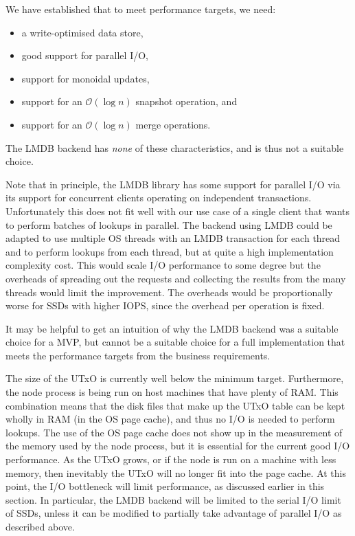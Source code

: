 \documentclass[11pt,a4paper]{article}
\begin{document}
We have established that to meet performance targets, we need:
\begin{itemize}
\item a write-optimised data store,
\item good support for parallel I/O,
\item support for monoidal updates,
\item support for an $\mathcal{O}(\log n)$ {\sc snapshot} operation, and
\item support for an $\mathcal{O}(\log n)$ {\sc merge} operations.
\end{itemize}
The LMDB backend has \emph{none} of these characteristics, and is thus not a
suitable choice.

Note that in principle, the LMDB library has some support for parallel I/O via
its support for concurrent clients operating on independent transactions.
Unfortunately this does not fit well with our use case of a single client that
wants to perform batches of lookups in parallel. The backend using LMDB could
be adapted to use multiple OS threads with an LMDB transaction for each thread
and to perform lookups from each thread, but at quite a high implementation
complexity cost. This would scale I/O performance to some degree but the
overheads of spreading out the requests and collecting the results from the
many threads would limit the improvement. The overheads would be proportionally
worse for SSDs with higher IOPS, since the overhead per operation is fixed.

It may be helpful to get an intuition of why the LMDB backend was a suitable
choice for a MVP, but cannot be a suitable choice for a full implementation
that meets the performance targets from the business requirements.

The size of the UTxO is currently well below the minimum target. Furthermore,
the node process is being run on host machines that have plenty of RAM. This
combination means that the disk files that make up the UTxO table can be kept
wholly in RAM (in the OS page cache), and thus no I/O is needed to perform
lookups. The use of the OS page cache does not show up in the measurement of
the memory used by the node process, but it is essential for the current good
I/O performance. As the UTxO grows, or if the node is run on a machine with
less memory, then inevitably the UTxO will no longer fit into the page cache.
At this point, the I/O bottleneck will limit performance, as discussed earlier
in this section. In particular, the LMDB backend will be limited to the serial
I/O limit of SSDs, unless it can be modified to partially take advantage of parallel I/O as described above.
\end{document}
